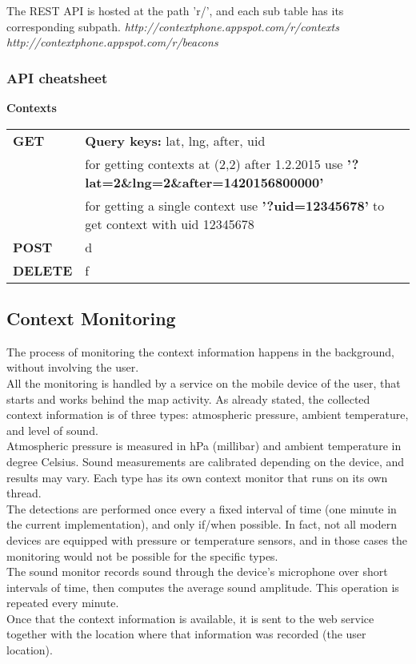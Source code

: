 \documentclass{sigchi}
\begin{document}
The REST API is hosted at the path 'r/', and each sub table has its corresponding subpath.
\textit{http://contextphone.appspot.com/r/contexts}\\
\textit{http://contextphone.appspot.com/r/beacons}

\subsubsection{API cheatsheet}

\textbf{Contexts}


\begin{tabularx}{.5\textwidth}{  p{}X }
\textbf{GET} & \textbf{Query keys:} lat, lng, after, uid\\
 & for getting contexts at (2,2) after 1.2.2015 use \textbf{'?lat=2\&lng=2\&after=1420156800000'}\\
 & for getting a single context use \textbf{'?uid=12345678'} to get context with uid 12345678\\
\textbf{POST} & d\\
\textbf{DELETE} & f\\
\end{tabularx}

\subsection{Context Monitoring}

The process of monitoring the context information happens in the background, without involving the user. \\
All the monitoring is handled by a service on the mobile device of the user, that starts and works behind the map activity.
As already stated, the collected context information is of three types: atmospheric pressure, ambient temperature, and level of sound. \\
Atmospheric pressure is measured in hPa (millibar) and ambient temperature in degree Celsius.
Sound measurements are calibrated depending on the device, and results may vary.
Each type has its own context monitor that runs on its own thread. \\
The detections are performed once every a fixed interval of time (one minute in the current implementation), and only if/when possible. In fact, not all modern devices are equipped with pressure or temperature sensors, and in those cases the monitoring would not be possible for the specific types.\\
The sound monitor records sound through the device's microphone over short intervals of time, then computes the average sound amplitude. This operation is repeated every minute. \\
Once that the context information is available, it is sent to the web service together with the location where that information was recorded (the user location).
\end{document}
